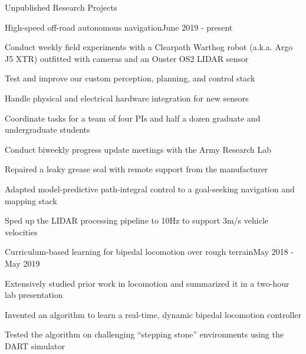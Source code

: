 \documentclass{resume} %
\begin{document}
\begin{rSection}{Unpublished Research Projects}

\begin{rProject}{High-speed off-road autonomous navigation}{June 2019 - present}
\item Conduct weekly field experiments with a Clearpath Warthog robot (a.k.a. Argo J5 XTR) outfitted with cameras and an Ouster OS2 LIDAR sensor
\item Test and improve our custom perception, planning, and control stack
\item Handle physical and electrical hardware integration for new sensors
\item Coordinate tasks for a team of four PIs and half a dozen graduate and undergraduate students
\item Conduct biweekly progress update meetings with the Army Research Lab
\item Repaired a leaky grease seal with remote support from the manufacturer
\item Adapted model-predictive path-integral control to a goal-seeking navigation and mapping stack
\item Sped up the LIDAR processing pipeline to 10Hz to support 3m/s vehicle velocities
\end{rProject}

\begin{rProject}{Curriculum-based learning for bipedal locomotion over rough terrain}{May 2018 - May 2019}
\item Extensively studied prior work in locomotion and summarized it in a two-hour lab presentation
\item Invented an algorithm to learn a real-time, dynamic bipedal locomotion controller
\item Tested the algorithm on challenging ``stepping stone'' environments using the DART simulator
\end{rProject}

\end{rSection}
\end{document}
